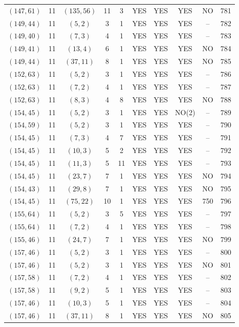 \begin{longtable}{|c|c|c|c|c|c|c|c|c|c|}
$(147, 61)$ & 11 & $(135, 56)$ & 11 & 3 & YES & YES & YES & NO & 781\\
$(149, 44)$ & 11 & $(5, 2)$ & 3 & 1 & YES & YES & YES & -- & 782\\
$(149, 40)$ & 11 & $(7, 3)$ & 4 & 1 & YES & YES & YES & -- & 783\\
$(149, 41)$ & 11 & $(13, 4)$ & 6 & 1 & YES & YES & YES & NO & 784\\
$(149, 44)$ & 11 & $(37, 11)$ & 8 & 1 & YES & YES & YES & NO & 785\\
$(152, 63)$ & 11 & $(5, 2)$ & 3 & 1 & YES & YES & YES & -- & 786\\
$(152, 63)$ & 11 & $(7, 2)$ & 4 & 1 & YES & YES & YES & -- & 787\\
$(152, 63)$ & 11 & $(8, 3)$ & 4 & 8 & YES & YES & YES & NO & 788\\
$(154, 45)$ & 11 & $(5, 2)$ & 3 & 1 & YES & YES & NO(2) & -- & 789\\
$(154, 59)$ & 11 & $(5, 2)$ & 3 & 1 & YES & YES & YES & -- & 790\\
$(154, 45)$ & 11 & $(7, 3)$ & 4 & 7 & YES & YES & YES & -- & 791\\
$(154, 45)$ & 11 & $(10, 3)$ & 5 & 2 & YES & YES & YES & -- & 792\\
$(154, 45)$ & 11 & $(11, 3)$ & 5 & 11 & YES & YES & YES & -- & 793\\
$(154, 45)$ & 11 & $(23, 7)$ & 7 & 1 & YES & YES & YES & NO & 794\\
$(154, 43)$ & 11 & $(29, 8)$ & 7 & 1 & YES & YES & YES & NO & 795\\
$(154, 45)$ & 11 & $(75, 22)$ & 10 & 1 & YES & YES & YES & 750 & 796\\
$(155, 64)$ & 11 & $(5, 2)$ & 3 & 5 & YES & YES & YES & -- & 797\\
$(155, 64)$ & 11 & $(7, 2)$ & 4 & 1 & YES & YES & YES & -- & 798\\
$(155, 46)$ & 11 & $(24, 7)$ & 7 & 1 & YES & YES & YES & NO & 799\\
$(157, 46)$ & 11 & $(5, 2)$ & 3 & 1 & YES & YES & YES & -- & 800\\
$(157, 46)$ & 11 & $(5, 2)$ & 3 & 1 & YES & YES & YES & NO & 801\\
$(157, 58)$ & 11 & $(7, 2)$ & 4 & 1 & YES & YES & YES & -- & 802\\
$(157, 58)$ & 11 & $(9, 2)$ & 5 & 1 & YES & YES & YES & -- & 803\\
$(157, 46)$ & 11 & $(10, 3)$ & 5 & 1 & YES & YES & YES & -- & 804\\
$(157, 46)$ & 11 & $(37, 11)$ & 8 & 1 & YES & YES & YES & NO & 805\\

\end{longtable}
